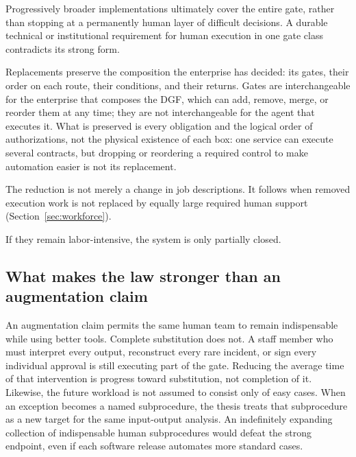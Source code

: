 Progressively broader implementations ultimately cover the entire gate, rather than stopping at a
permanently human layer of difficult decisions. A durable technical or institutional requirement for
human execution in one gate class contradicts its strong form.

 Replacements preserve the composition the enterprise has decided: its gates, their order on each route,
their conditions, and their returns. Gates are interchangeable for the enterprise that composes the
DGF, which can add, remove, merge, or reorder them at any time; they are not interchangeable for the
agent that executes it. What is preserved is every obligation and the logical order of authorizations,
not the physical existence of each box: one service can execute several contracts, but dropping or
reordering a required control to make automation easier is not its replacement.

 The reduction is not merely a change in job
descriptions. It follows when removed execution work is not replaced by equally large required human
support (Section~\ref{sec:workforce}).

 If they
remain labor-intensive, the system is only partially closed.

\subsection{What makes the law stronger than an augmentation claim}

An augmentation claim permits the same human team to remain indispensable while using better tools.
Complete substitution does not. A staff member who must interpret every output, reconstruct every rare
incident, or sign every individual approval is still executing part of the gate. Reducing the average
time of that intervention is progress toward substitution, not completion of it. Likewise, the future
workload is not assumed to consist only of easy cases. When an exception becomes a named subprocedure,
the thesis treats that subprocedure as a new target for the same input-output analysis. An
indefinitely expanding collection of indispensable human subprocedures would defeat the strong
endpoint, even if each software release automates more standard cases.

